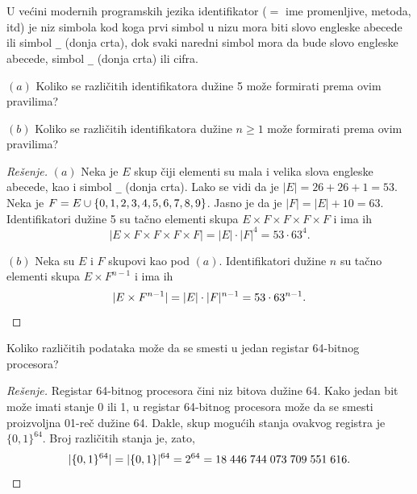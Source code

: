 \begin{EX}
  U ve\'cini modernih programskih jezika identifikator ($=$ ime promenljive, metoda, itd) je niz simbola kod koga
  prvi simbol u nizu mora biti slovo engleske abecede ili simbol \verb"_" (donja crta), dok svaki naredni simbol
  mora da bude slovo engleske abecede, simbol \verb"_" (donja crta) ili cifra.
  
  $(a)$ Koliko se razli\v citih identifikatora du\v zine 5 mo\v ze formirati prema ovim pravilima?

  $(b)$ Koliko se razli\v citih identifikatora du\v zine $n \ge 1$ mo\v ze formirati prema ovim pravilima?
\end{EX}
\begin{proof}[Re\v senje]
  $(a)$ Neka je $E$ skup \v ciji elementi su mala i velika slova engleske abecede, kao i simbol \verb"_" (donja crta).
  Lako se vidi da je $|E| = 26 + 26 + 1 = 53$. Neka je $F = E \cup \{0, 1, 2, 3, 4, 5, 6, 7, 8, 9\}$. Jasno je da je
  $|F| = |E| + 10 = 63$. Identifikatori du\v zine 5 su ta\v cno elementi skupa $E \times F \times F \times F \times F$
  i ima ih
  $$
    |E \times F \times F \times F \times F| = |E| \cdot |F|^4 = 53 \cdot 63^4.
  $$
  
  \medskip
  
  $(b)$ Neka su $E$ i $F$ skupovi kao pod $(a)$. Identifikatori du\v zine $n$ su ta\v cno elementi skupa
  $E \times F^{n-1}$ i ima ih
  $$
    |E \times F^{n-1}| = |E| \cdot |F|^{n-1} = 53 \cdot 63^{n-1}.\qedhere
  $$
\end{proof}

\begin{EX}
  Koliko razli\v citih podataka mo\v ze da se smesti u jedan registar 64-bitnog procesora?
\end{EX}
\begin{proof}[Re\v senje]
  Registar 64-bitnog procesora \v cini niz bitova du\v zine 64. Kako jedan bit mo\v ze imati stanje 0 ili 1,
  u registar 64-bitnog procesora mo\v ze da se smesti pro\-iz\-voljna 01-re\v c du\v zine 64. Dakle, skup mogu\'cih stanja
  ovakvog registra je $\{0, 1\}^{64}$. Broj razli\v citih stanja je, zato,
  $$
    |\{0, 1\}^{64}| = |\{0,1\}|^{64} = 2^{64} = 18\;446\;744\;073\;709\;551\;616. \qedhere
  $$
\end{proof}

